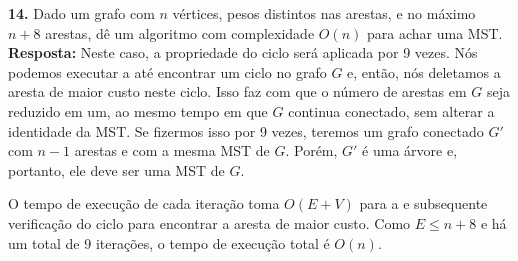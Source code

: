 
\textbf{14.} Dado um grafo com $n$ vértices, pesos distintos nas arestas, e no máximo $n + 8$ arestas, dê um algoritmo com complexidade $O(n)$ para achar uma MST.\\[6pt]
\textbf{Resposta:} Neste caso, a propriedade do ciclo será aplicada por 9 vezes. Nós podemos executar a  até encontrar um ciclo no grafo $G$ e, então, nós deletamos a aresta de maior custo neste ciclo. Isso faz com que o número de arestas em $G$ seja reduzido em um, ao mesmo tempo em que $G$ continua conectado, sem alterar a identidade da MST. Se fizermos isso por 9 vezes, teremos um grafo conectado $G'$ com $n - 1$ arestas e com a mesma MST de $G$. Porém, $G'$ é uma árvore e, portanto, ele deve ser uma MST de $G$.

O tempo de execução de cada iteração toma $O(E + V)$ para a  e subsequente verificação do ciclo para encontrar a aresta de maior custo. Como $E \leq n+8$ e há um total de 9 iterações, o tempo de execução total é $O(n)$.\\[6pt]